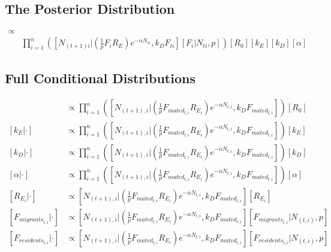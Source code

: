 \documentclass{article}[12pt]
\begin{document}
\subsection*{The Posterior Distribution}
\begin{align*}
[R_0, k_E, k_D, \alpha , \boldsymbol{R_E}, \boldsymbol{F} | \boldsymbol{N_t}, \boldsymbol{N_{t+1}}] \propto & \\ 
& \prod_{i=1}^{n}\left([N_{(t+1)i}|\left(\frac{1}{p}F_iR_E\right)e^{-\alpha N_{ti}}, k_DF_{ti}][F_i|N_{ti},p]\right)[R_0][k_E][k_D][\alpha]
\end{align*}

\subsection*{Full Conditional Distributions}
\begin{align*}
[R_0 | \cdot] & \propto \prod_{i=1}^{n} \left( \left[ N_{(t+1), i} | \left(\frac{1}{p}F_{{mated}_{t,i}}R_{E_i} \right) e^{-\alpha N_{t, i}}, k_D F_{{mated}_{t,i}}\right] \right)[R_0] \\
[k_E | \cdot] & \propto \prod_{i=1}^{n}\left( \left[N_{(t+1), i} | \left(\frac{1}{p}F_{{mated}_{t,i}}R_{E_i} \right)e^{-\alpha N_{t, i}}, k_DF_{{mated}_{t,i}} \right] \right) \left[k_E \right] \\
[k_D | \cdot] & \propto \prod_{i=1}^{n}\left( \left[N_{(t+1), i} | \left(\frac{1}{p}F_{{mated}_{t,i}}R_{E_i} \right)e^{-\alpha N_{t, i}}, k_DF_{{mated}_{t,i}} \right] \right) \left[k_D \right] \\
[\alpha | \cdot] & \propto \prod_{i=1}^{n}\left( \left[N_{(t+1), i} | \left(\frac{1}{p}F_{{mated}_{t,i}}R_{E_i} \right)e^{-\alpha N_{t, i}}, k_DF_{{mated}_{t,i}} \right] \right) \left [\alpha \right] \\
[R_{E_i} | \cdot] & \propto \left[ N_{(t+1), i} | \left(\frac{1}{p}F_{{mated}_{t,i}}R_{E_i}\right)e^{-\alpha N_{t, i}}, k_DF_{{mated}_{t,i}}\right] \left[R_{E_i}\right] \\
[F_{{migrants}_{t,i}} | \cdot] & \propto \left[N_{(t+1), i}|\left(\frac{1}{p}F_{{mated}_{t,i}}R_{E_i} \right)e^{-\alpha N_{t, i}}, k_DF_{{mated}_{t,i}} \right] \left[F_{{migrants}_{t,i}} | N_{(t, i)},p \right] \\
[F_{{residents}_{t,i}} | \cdot] & \propto \left[N_{(t+1), i}|\left(\frac{1}{p}F_{{mated}_{t,i}}R_{E_i} \right)e^{-\alpha N_{t, i}}, k_DF_{{mated}_{t,i}} \right] \left[F_{{residents}_{t,i}} | N_{(t, i)},p \right]
\end{align*}


\end{document}
